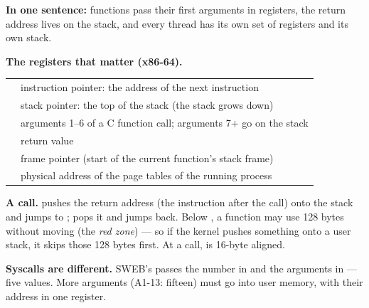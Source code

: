 \documentclass[11pt]{report}
\begin{document}
\textbf{In one sentence:} functions pass their first arguments in registers, the return address
lives on the stack, and every thread has its own set of registers and its own stack.

\textbf{The registers that matter (x86-64).}
\begin{center}
\small
\begin{tabular}{L{2.4cm}L{11cm}}
\toprule
{} & instruction pointer: the address of the next instruction \\
 & stack pointer: the top of the stack (the stack grows down) \\
 & arguments 1--6 of a C function call; arguments 7+ go on the stack \\
 & return value \\
 & frame pointer (start of the current function's stack frame) \\
 & physical address of the page tables of the running process \\
\bottomrule
\end{tabular}
\end{center}

\textbf{A call.}  pushes the return address (the instruction after the call) onto the
stack and jumps to ;  pops it and jumps back. Below , a function may use
128 bytes without moving  (the \emph{red zone}) --- so if the kernel pushes something onto
a user stack, it skips those 128 bytes first. At a call,  is 16-byte aligned.

\textbf{Syscalls are different.} SWEB's  passes the number in  and
the arguments in  --- five values. More arguments (A1-13: fifteen)
must go into user memory, with their address in one register.
\end{document}
